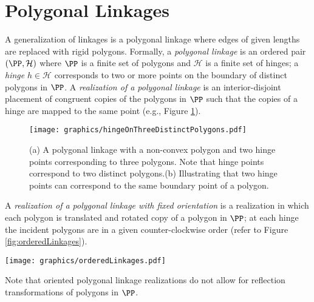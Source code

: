 \documentclass[10pt]{CSUNthesis}
\theoremstyle{plain}%
\theoremstyle{definition}
\theoremstyle{remark}
\newcommand{\HH}{{\mathcal{H}}} %
\begin{document}
\section{Polygonal Linkages}\label{sec:hinge}
A generalization of linkages is a polygonal linkage where edges of given lengths are replaced with rigid polygons.
Formally, a \textit{polygonal linkage} is an ordered pair $\left(\PP,\HH \right)$ where $\PP$ is a finite set of polygons and $\HH$ is a finite set of hinges; a \textit{hinge} $h\in \HH$ corresponds to two or more points on the boundary of distinct polygons in $\PP$.  
A \emph{realization of a polygonal linkage} is an interior-disjoint placement of congruent copies of the polygons in $\PP$ such that the copies of a hinge are mapped to the same point (e.g., Figure \ref{fig:linkage-1}).  
\begin{figure}[!htbp]
\begin{center}
\texttt{[image: graphics/hingeOnThreeDistinctPolygons.pdf]}
\end{center} 
\caption{(a) A polygonal linkage with a non-convex polygon and two hinge points corresponding to 
three polygons.  Note that hinge points correspond to two distinct polygons.(b) Illustrating that 
two hinge points can correspond to the same boundary point of a polygon.}
\label{fig:linkage-1}
\end{figure}
A \textit{realization of a polygonal linkage with fixed orientation} is a realization in which each polygon is translated and rotated copy of a polygon in $\PP$; at each hinge the incident polygons are in a given counter-clockwise order (refer to Figure \ref{fig:orderedLinkages}).

\begin{minipage}{\linewidth}
\begin{center}
\texttt{[image: graphics/orderedLinkages.pdf]}
\label{fig:orderedLinkages}
\end{center}
\end{minipage}

Note that oriented polygonal linkage realizations do not allow for reflection transformations of polygons in $\PP$.
\end{document}
